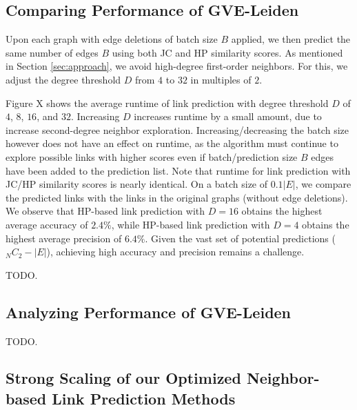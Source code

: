 
% 
% 




\subsection{Comparing Performance of GVE-Leiden}

Upon each graph with edge deletions of batch size $B$ applied, we then predict the same number of edges $B$ using both JC and HP similarity scores. As mentioned in Section \ref{sec:approach}, we avoid high-degree first-order neighbors. For this, we adjust the degree threshold $D$ from $4$ to $32$ in multiples of $2$.

Figure X shows the average runtime of link prediction with degree threshold $D$ of $4$, $8$, $16$, and $32$. Increasing $D$ increases runtime by a small amount, due to increase second-degree neighbor exploration. Increasing/decreasing the batch size however does not have an effect on runtime, as the algorithm must continue to explore possible links with higher scores even if batch/prediction size $B$ edges have been added to the prediction list. Note that runtime for link prediction with JC/HP similarity scores is nearly identical. On a batch size of $0.1 |E|$, we compare the predicted links with the links in the original graphs (without edge deletions). We observe that HP-based link prediction with $D = 16$ obtains the highest average accuracy of $2.4\%$, while HP-based link prediction with $D = 4$ obtains the highest average precision of $6.4\%$. Given the vast set of potential predictions (${}_N C_2 - |E|$), achieving high accuracy and precision remains a challenge.

TODO.







\subsection{Analyzing Performance of GVE-Leiden}

TODO.




\subsection{Strong Scaling of our Optimized Neighbor-based Link Prediction Methods}

